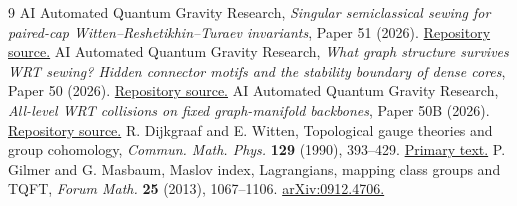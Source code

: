 \documentclass[11pt]{article}
\theoremstyle{remark}\newtheorem{remark}[theorem]{Remark}
\begin{document}
\begin{thebibliography}{9}
 AI Automated Quantum Gravity Research,
\emph{Singular semiclassical sewing for paired-cap
Witten--Reshetikhin--Turaev invariants}, Paper 51 (2026).
\href{https://github.com/g3173028019-beep/ai-automated-quantum-gravity-research/tree/main/papers/51-singular-wrt-semiclassical-sewing}
{Repository source.}
 AI Automated Quantum Gravity Research,
\emph{What graph structure survives WRT sewing? Hidden connector
motifs and the stability boundary of dense cores}, Paper 50 (2026).
\href{https://github.com/g3173028019-beep/ai-automated-quantum-gravity-research/tree/main/papers/50-wrt-graph-detection-and-stability}
{Repository source.}
 AI Automated Quantum Gravity Research,
\emph{All-level WRT collisions on fixed graph-manifold backbones},
Paper 50B (2026).
\href{https://github.com/g3173028019-beep/ai-automated-quantum-gravity-research/tree/main/papers/50b-wrt-topological-blindness}
{Repository source.}
 R. Dijkgraaf and E. Witten,
Topological gauge theories and group cohomology,
\emph{Commun. Math. Phys.} \textbf{129} (1990), 393--429.
\href{https://www.ias.edu/sites/default/files/sns/\%5B126\%5DCommMathPhys129-1990.pdf}
{Primary text.}
 P. Gilmer and G. Masbaum,
Maslov index, Lagrangians, mapping class groups and TQFT,
\emph{Forum Math.} \textbf{25} (2013), 1067--1106.
\href{https://arxiv.org/abs/0912.4706}{arXiv:0912.4706.}
\end{thebibliography}
\end{document}
